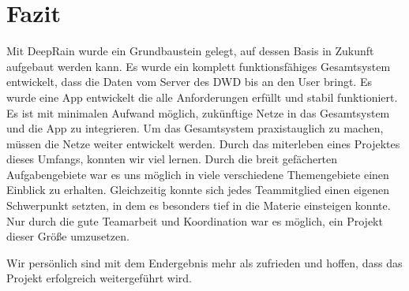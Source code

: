 \section{Fazit}
Mit DeepRain wurde ein Grundbaustein gelegt, auf dessen Basis in Zukunft aufgebaut werden kann. 
Es wurde ein komplett funktionsfähiges Gesamtsystem entwickelt, dass die Daten vom Server des DWD bis an den User bringt.
Es wurde eine App entwickelt die alle Anforderungen erfüllt und stabil funktioniert. 
Es ist mit minimalen Aufwand möglich, zukünftige Netze in das Gesamtsystem und die App zu integrieren. 
Um das Gesamtsystem praxistauglich zu machen, müssen die Netze weiter entwickelt werden. 
Durch das miterleben eines Projektes dieses Umfangs, konnten wir viel lernen. 
Durch die breit gefächerten Aufgabengebiete war es uns möglich in viele verschiedene Themengebiete einen Einblick zu erhalten. 
Gleichzeitig konnte sich jedes Teammitglied einen eigenen Schwerpunkt setzten, in dem es besonders tief in die Materie einsteigen konnte. 
Nur durch die gute Teamarbeit und Koordination war es möglich, ein Projekt dieser Größe umzusetzen. 


\noindent Wir persönlich sind mit dem Endergebnis mehr als zufrieden und hoffen, dass das Projekt erfolgreich weitergeführt wird.

